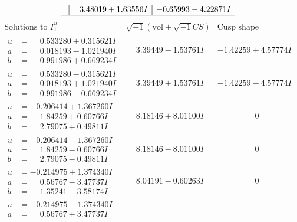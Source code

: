 \documentclass[1p]{elsarticle_modified}
\theoremstyle{definition}
\newcommand{\I}{\sqrt{-1}}
\begin{document}
$$\begin{array}{c|c|c}
 & \phantom{-}3.48019 + 1.63556 I & -0.65993 - 4.22871 I\\
 \hline 
 \end{array}$$\newpage$$\begin{array}{c|c|c}  
\text{Solutions to }I^u_{1}& \I (\text{vol} + \sqrt{-1}CS) & \text{Cusp shape}\\
 \hline 
\begin{aligned}
u &= \phantom{-}0.533280 + 0.315621 I \\
a &= \phantom{-}0.018193 - 1.021940 I \\
b &= \phantom{-}0.991986 + 0.669234 I\end{aligned}
 & \phantom{-}3.39449 - 1.53761 I & -1.42259 + 4.57774 I \\ \hline\begin{aligned}
u &= \phantom{-}0.533280 - 0.315621 I \\
a &= \phantom{-}0.018193 + 1.021940 I \\
b &= \phantom{-}0.991986 - 0.669234 I\end{aligned}
 & \phantom{-}3.39449 + 1.53761 I & -1.42259 - 4.57774 I \\ \hline\begin{aligned}
u &= -0.206414 + 1.367260 I \\
a &= \phantom{-}1.84259 + 0.60766 I \\
b &= \phantom{-}2.79075 + 0.49811 I\end{aligned}
 & \phantom{-}8.18146 + 8.01100 I & \phantom{-0.000000 } 0 \\ \hline\begin{aligned}
u &= -0.206414 - 1.367260 I \\
a &= \phantom{-}1.84259 - 0.60766 I \\
b &= \phantom{-}2.79075 - 0.49811 I\end{aligned}
 & \phantom{-}8.18146 - 8.01100 I & \phantom{-0.000000 } 0 \\ \hline\begin{aligned}
u &= -0.214975 + 1.374340 I \\
a &= \phantom{-}0.56767 - 3.47737 I \\
b &= \phantom{-}1.35241 - 3.58174 I\end{aligned}
 & \phantom{-}8.04191 - 0.60263 I & \phantom{-0.000000 } 0 \\ \hline\begin{aligned}
u &= -0.214975 - 1.374340 I \\
a &= \phantom{-}0.56767 + 3.47737 I \\

\end{aligned}
\end{array}$$
\end{document}
